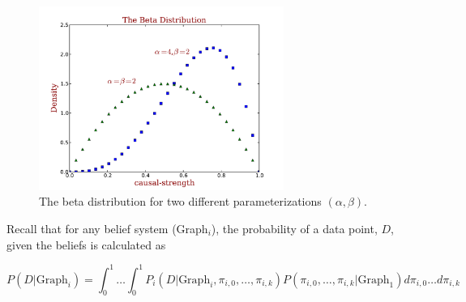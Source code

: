 \documentclass[12pt]{article}
\begin{document}
\begin{figure}
        \centering
        \includegraphics[width=80mm]{beta.pdf}
  \caption{The beta distribution for two different parameterizations $(\alpha, \beta)$.}
                \label{fig:beta}
        \end{figure}%

Recall that for any belief system (Graph$_i$), the probability of a data point, $D$, given the beliefs is calculated as

$$P(D | \text{Graph}_i)=\int_0^1 \hdots \int_0^1 P_i(D | \text{Graph}_i, \pi_{i, 0},\ldots, \pi_{i, k})P(\pi_{i, 0},\ldots, \pi_{i, k} | \text{Graph}_1) d\pi_{i, 0}\hdots d\pi_{i, k}$$
\end{document}
